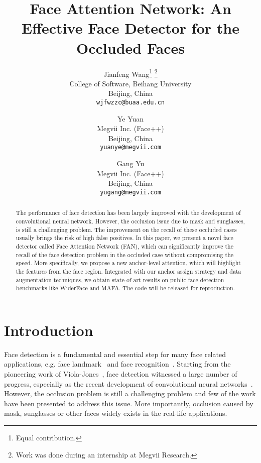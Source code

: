 \documentclass[10pt,twocolumn,letterpaper]{article}
\begin{document}
\title{Face Attention Network: An Effective Face Detector for the Occluded Faces}




\author{
Jianfeng Wang\thanks{Equal contribution.} \thanks{Work was done during an internship at Megvii Research.}\\
College of Software, Beihang University\\
Beijing, China\\
{\tt\small wjfwzzc@buaa.edu.cn}
\and
Ye Yuan\footnotemark[1]\\
Megvii Inc. (Face++)\\
Beijing, China\\
{\tt\small yuanye@megvii.com}
\and
Gang Yu\\
Megvii Inc. (Face++)\\
Beijing, China\\
{\tt\small yugang@megvii.com}
}


\maketitle










\begin{abstract}
The performance of face detection has been largely improved with the development of convolutional neural network. However, the occlusion issue due to mask and sunglasses, is still a challenging problem. The improvement on the recall of these occluded cases usually brings the risk of high false positives. In this paper, we present a novel face detector called Face Attention Network (FAN), which can significantly improve the recall of the face detection problem in the occluded case without compromising the speed. More specifically, we propose a new anchor-level attention, which will highlight the features from the face region. Integrated with our anchor assign strategy and data augmentation techniques, we obtain state-of-art results on public face detection benchmarks like WiderFace and MAFA. The code will be released for reproduction.
\end{abstract}

\section{Introduction}

Face detection is a fundamental and essential step for many face related applications, e.g. face landmark~\cite{xiong2013supervised, zhu2016face} and face recognition~\cite{parkhi2015deep,schroff2015facenet,zhu2015high}. Starting from the pioneering work of Viola-Jones~\cite{viola2004robust}, face detection witnessed a large number of progress, especially as the recent development of convolutional neural networks~\cite{He2015}. However, the occlusion problem is still a challenging problem and few of the work have been presented to address this issue. More importantly, occlusion caused by mask, sunglasses or other faces widely exists in the real-life applications. 
\end{document}
